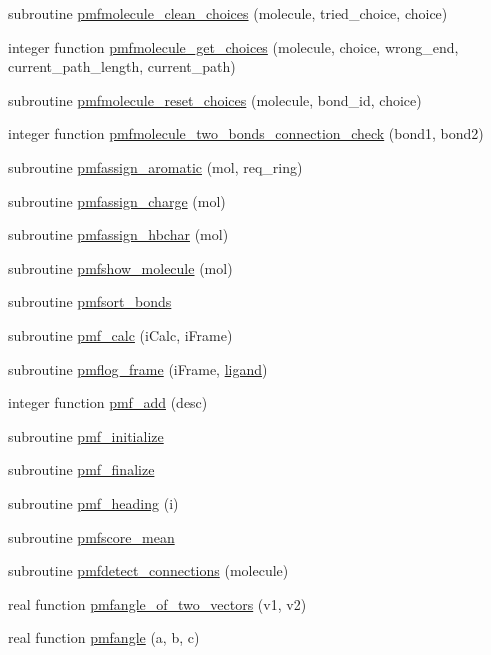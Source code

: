 \begin{DoxyCompactItemize}
\item 
subroutine \hyperlink{classcalc__pmf_a4c51d400a72121dbba99d441a2bfea6b}{pmfmolecule\-\_\-clean\-\_\-choices} (molecule, tried\-\_\-choice, choice)
\item 
integer function \hyperlink{classcalc__pmf_a5d1b84516b4045d510702abceb249d8a}{pmfmolecule\-\_\-get\-\_\-choices} (molecule, choice, wrong\-\_\-end, current\-\_\-path\-\_\-length, current\-\_\-path)
\item 
subroutine \hyperlink{classcalc__pmf_ab349db3ae61f138604db0d9719349fd1}{pmfmolecule\-\_\-reset\-\_\-choices} (molecule, bond\-\_\-id, choice)
\item 
integer function \hyperlink{classcalc__pmf_a642a8d188ca37abd91cc59b69fa50158}{pmfmolecule\-\_\-two\-\_\-bonds\-\_\-connection\-\_\-check} (bond1, bond2)
\item 
subroutine \hyperlink{classcalc__pmf_a109122bbf10a4b4185decef9463f3009}{pmfassign\-\_\-aromatic} (mol, req\-\_\-ring)
\item 
subroutine \hyperlink{classcalc__pmf_a2482f05b2ba60ac224d87f8ce0c89033}{pmfassign\-\_\-charge} (mol)
\item 
subroutine \hyperlink{classcalc__pmf_afd6262e11d30c758385ae46fd282c574}{pmfassign\-\_\-hbchar} (mol)
\item 
subroutine \hyperlink{classcalc__pmf_a15700c91a9d09ccd6da63e1cf1fe7547}{pmfshow\-\_\-molecule} (mol)
\item 
subroutine \hyperlink{classcalc__pmf_ab6f464407bf5090b40e3a0c915eeb283}{pmfsort\-\_\-bonds}
\item 
subroutine \hyperlink{classcalc__pmf_a0e57d1409c14150ce20ffbf26376a485}{pmf\-\_\-calc} (i\-Calc, i\-Frame)
\item 
subroutine \hyperlink{classcalc__pmf_a464bb7fb9f994fd1ae6318110bc57631}{pmflog\-\_\-frame} (i\-Frame, \hyperlink{classcalc__pmf_adb3a353d55dd9c86c7a56dfec5bfef05}{ligand})
\item 
integer function \hyperlink{classcalc__pmf_a4caf9759f3678b95aaa1f48fba8eb333}{pmf\-\_\-add} (desc)
\item 
subroutine \hyperlink{classcalc__pmf_acfa385c68b0b238d175af42417a8209b}{pmf\-\_\-initialize}
\item 
subroutine \hyperlink{classcalc__pmf_abaffcc0fb18adf0a3084d8a6a0be60e6}{pmf\-\_\-finalize}
\item 
subroutine \hyperlink{classcalc__pmf_a7a15b746c74b0245da6842da20bab499}{pmf\-\_\-heading} (i)
\item 
subroutine \hyperlink{classcalc__pmf_aeb687d57198896c002165b074ebd8e16}{pmfscore\-\_\-mean}
\item 
subroutine \hyperlink{classcalc__pmf_a9dca279d37fdfd1f5f387211c3c6c697}{pmfdetect\-\_\-connections} (molecule)
\item 
real function \hyperlink{classcalc__pmf_a3941dce9024f8f1c6b329d9fe5e821f5}{pmfangle\-\_\-of\-\_\-two\-\_\-vectors} (v1, v2)
\item 
real function \hyperlink{classcalc__pmf_a752e9d34a54d97679d8cb67ff3f2a91a}{pmfangle} (a, b, c)
\end{DoxyCompactItemize}
